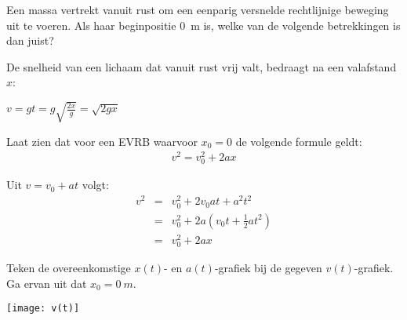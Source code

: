 \documentclass{ximera}
\begin{document}
\begin{exercise}
	Een massa vertrekt vanuit rust om een eenparig versnelde rechtlijnige beweging uit te voeren. Als haar beginpositie \SI{0}{m} is, welke van de volgende betrekkingen is dan juist?
	\begin{multipleChoice}
	\end{multipleChoice}
\end{exercise}

\begin{exercise}
	De snelheid van een lichaam dat vanuit rust vrij valt, bedraagt na een valafstand $x$:
	\begin{multipleChoice}
		\choice{$v=2gx$}
		\choice[correct]{$v=\sqrt{2gx}$}
		\choice{$v=gx$}
		\choice{$v=\sqrt{\frac{gx}{2}}$}
	\end{multipleChoice}
	\begin{oplossing}
		$v=gt=g\sqrt{\frac{2x}{g}}=\sqrt{2gx}$
	\end{oplossing}
\end{exercise}

\begin{exercise}
	Laat zien dat voor een EVRB waarvoor $x_0=0$ de volgende formule geldt:
	\begin{eqnarray*}
		v^2=v_0^2+2ax
	\end{eqnarray*}

	\begin{oplossing}
		Uit $v=v_0+at$ volgt:
		\begin{eqnarray*}
			v^2&=&v_0^2+2v_0at+a^2t^2\\
			&=&v_0^2+2a(v_0t+\frac{1}{2}at^2)\\
			&=&v_0^2+2ax
		\end{eqnarray*}
	\end{oplossing}
\end{exercise}



\begin{exercise}
	Teken de overeenkomstige $x(t)$- en $a(t)$-grafiek bij de gegeven $v(t)$-grafiek. Ga ervan uit dat $x_0=\SI{0}{m}$.
	\begin{image}[0.3\textwidth]
		\texttt{[image: v(t)]}
	\end{image}
\end{exercise}
\end{document}
